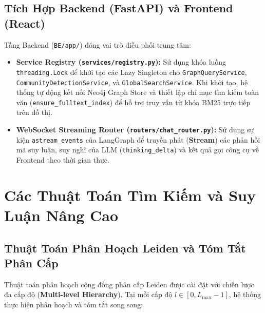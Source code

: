 \documentclass[11pt,a4paper]{report}
\begin{document}
\section{Tích Hợp Backend (FastAPI) và Frontend (React)}
Tầng Backend (\texttt{BE/app/}) đóng vai trò điều phối trung tâm:
\begin{itemize}
    \item \textbf{Service Registry (\texttt{services/registry.py}):} Sử dụng khóa luồng \texttt{threading.Lock} để khởi tạo các Lazy Singleton cho \texttt{GraphQueryService}, \texttt{CommunityDetectionService}, và \texttt{GlobalSearchService}. Khi khởi tạo, hệ thống tự động kết nối Neo4j Graph Store và thiết lập chỉ mục tìm kiếm toàn văn (\texttt{ensure\_fulltext\_index}) để hỗ trợ truy vấn từ khóa BM25 trực tiếp trên đồ thị.
    \item \textbf{WebSocket Streaming Router (\texttt{routers/chat\_router.py}):} Sử dụng sự kiện \texttt{astream\_events} của LangGraph để truyền phát (\textbf{Stream}) các phản hồi mã suy luận, suy nghĩ của LLM (\texttt{thinking\_delta}) và kết quả gọi công cụ về Frontend theo thời gian thực.
\end{itemize}

\chapter{Các Thuật Toán Tìm Kiếm và Suy Luận Nâng Cao}

\section{Thuật Toán Phân Hoạch Leiden và Tóm Tắt Phân Cấp}
Thuật toán phân hoạch cộng đồng phân cấp Leiden được cài đặt với chiến lược đa cấp độ (\textbf{Multi-level Hierarchy}). Tại mỗi cấp độ $l \in [0, L_{\max}-1]$, hệ thống thực hiện phân hoạch và tóm tắt song song:
\end{document}
